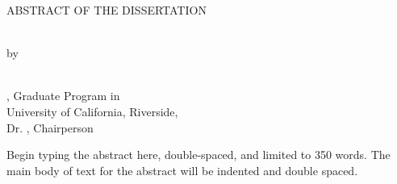 \begin{center}
    \begin{spacing}{1.0}

        ABSTRACT OF THE DISSERTATION
        \\
        \null

        \Title
        \\


        by
        \\


        \Author
        \\
        \null

        \Degree, Graduate Program in \FieldofStudy \\
        University of California, Riverside, \ConferralDate \\
        Dr. \CommChair, Chairperson
        \\
        \null
    \end{spacing}
\end{center}

\justifying

Begin typing the abstract here, double-spaced, and limited to 350 words.
The main body of text for the abstract will be indented and double spaced.
